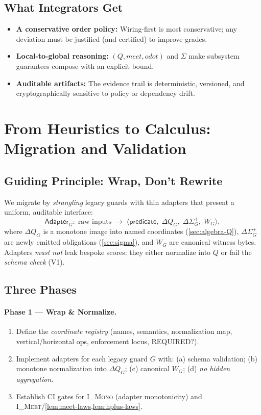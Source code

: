 \documentclass[11pt]{article}
\theoremstyle{plain}
\theoremstyle{definition}
\theoremstyle{remark}
\def\Q{Q}%
\def\Sig{\Sigma}%
\def\vmeet{meet}%
\def\hplus{odot}%
\DeclareRobustCommand{\Q}{\texorpdfstring{\ensuremath{\mathcal{Q}}}{Q}}     %
\DeclareRobustCommand{\Sig}{\texorpdfstring{\ensuremath{\Sigma}}{\Sigma}}   %
\newcommand{\vmeet}{\wedge}                    %
\newcommand{\hplus}{\odot}                     %
\newcommand{\IMeet}{\textsc{I\_Meet}}
\newcommand{\IMono}{\textsc{I\_Mono}}
\def\Q{Q}%
\def\Sig{\Sigma}%
\def\vmeet{meet}%
\def\hplus{odot}%
\begin{document}
\subsection{What Integrators Get}
\begin{itemize}[leftmargin=1.6em]
  \item \textbf{A conservative order policy:} Wiring-first is most conservative; any deviation must be justified (and certified) to improve grades.
  \item \textbf{Local-to-global reasoning:} \((\Q,\vmeet,\hplus)\) and \(\Sig\) make subsystem guarantees compose with an explicit bound.
  \item \textbf{Auditable artifacts:} The evidence trail is deterministic, versioned, and cryptographically sensitive to policy or dependency drift.
\end{itemize}


\section{From Heuristics to Calculus: Migration and Validation}
\label{sec:migration}

\subsection{Guiding Principle: Wrap, Don’t Rewrite}
We migrate by \emph{strangling} legacy guards with thin adapters that present a uniform, auditable interface:
\[
  \textsf{Adapter}_G:\; \text{raw inputs} \;\longrightarrow\;
  \big\langle \textsf{predicate},\; \Delta\Q_G,\; \Delta\Sigma_G^{+},\; W_G \big\rangle,
\]
where $\Delta\Q_G$ is a monotone image into named coordinates (\cref{sec:algebra-Q}), $\Delta\Sigma_G^{+}$ are newly emitted obligations (\cref{sec:sigma}), and $W_G$ are canonical witness bytes. Adapters \emph{must not} leak bespoke scores: they either normalize into $\Q$ or fail the \emph{schema check} (V1).

\subsection{Three Phases}
\paragraph{Phase 1 — Wrap \& Normalize.}
\begin{enumerate}[leftmargin=2em,label=(P1.\arabic*)]
  \item Define the \emph{coordinate registry} (names, semantics, normalization map, vertical/horizontal ops, enforcement locus, REQUIRED?).
  \item Implement adapters for each legacy guard $G$ with: (a) schema validation; (b) monotone normalization into $\Delta\Q_G$; (c) canonical $W_G$; (d) \emph{no hidden aggregation}.
  \item Establish CI gates for \IMono{} (adapter monotonicity) and \IMeet{}/\hspace{0pt}\cref{lem:meet-laws,lem:hplus-laws}.
\end{enumerate}
\end{document}
